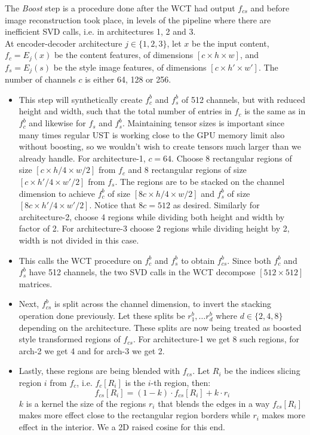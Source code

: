 The \textit{Boost} step is a procedure done after the WCT had output $f_{cs}$ and before image reconstruction took place, in levels of the pipeline where there are inefficient SVD calls, i.e. in architectures 1, 2 and 3.\\
At encoder-decoder architecture $j\in\{1,2,3\}$, let $x$ be the input content, $f_c = E_j(x)$ be the content features, of dimensions $[c \times h \times w]$, and $f_s = E_j(s)$ be the style image features, of dimensions $[c \times h' \times w']$. The number of channels $c$ is either 64, 128 or 256.
\begin{itemize}
	\item This step will synthetically create $f_c^b$ and $f_s^b$ of 512 channels, but with reduced height and width, such that the total number of entries in $f_c$ is the same as in $f_c^b$ and likewise for $f_s$ and $f_s^b$. Maintaining tensor sizes is important since many times regular UST is working close to the GPU memory limit also without boosting, so we wouldn't wish to create tensors much larger than we already handle. For architecture-1, $c=64$. Choose 8 rectangular regions of size $[c \times h/4 \times w/2]$ from $f_c$ and 8 rectangular regions of size $[c \times h'/4 \times w'/2]$ from $f_s$. The regions are to be stacked on the channel dimension to achieve $f_c^b$ of size $[8c \times h/4 \times w/2]$ and $f_s^b$ of size $[8c \times h'/4 \times w'/2]$. Notice that $8c=512$ as desired. Similarly for architecture-2, choose 4 regions while dividing both height and width by factor of 2. For architecture-3 choose 2 regions while dividing height by 2, width is not divided in this case. 
	
	\item This calls the WCT procedure on $f_c^b$ and $f_s^b$ to obtain $f_{cs}^b$. Since both $f_c^b$ and $f_s^b$ have 512 channels, the two SVD calls in the WCT decompose $[512\times 512]$ matrices.
	
	\item Next, $f_{cs}^b$ is split across the channel dimension, to invert the stacking operation done previously. Let these splits be $r_1^b, \dots r_d^b$ where $d\in\{2,4,8\}$ depending on the architecture. These splits are now being treated as boosted style transformed regions of $f_{cs}$. For architecture-1 we get 8 such regions, for arch-2 we get 4 and for arch-3 we get 2.
	
	\item Lastly, these regions are being blended with $f_{cs}$. Let $R_i$ be the indices slicing region $i$ from $f_c$, i.e. $f_c[R_i]$ is the $i$-th region, then:
	\begin{equation}
	f_{cs}[R_i] = (1-k)\cdot f_{cs}[R_i] + k\cdot r_i
	\end{equation}
	$k$ is a kernel the size of the regions $r_i$ that blends the edges in a way $f_{cs}[R_i]$ makes more effect close to the rectangular region borders while $r_i$ makes more effect in the interior. We a 2D raised cosine for this end. 
\end{itemize}

